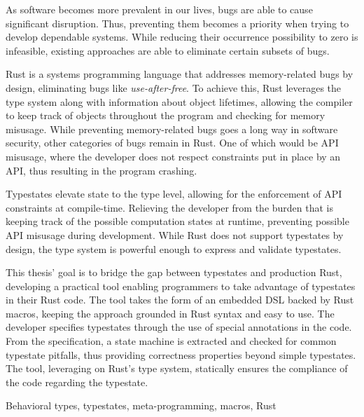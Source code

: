 

As software becomes more prevalent in our lives, bugs are able to cause significant disruption.
Thus, preventing them becomes a priority when trying to develop dependable systems.
While reducing their occurrence possibility to zero is infeasible,
existing approaches are able to eliminate certain subsets of bugs.

Rust is a systems programming language that addresses memory-related bugs by design,
eliminating bugs like \emph{use-after-free}.
To achieve this, Rust leverages the type system along with information about object lifetimes,
allowing the compiler to keep track of objects throughout the program and checking for memory misusage.
While preventing memory-related bugs goes a long way in software security, other categories of bugs remain in Rust.
One of which would be \gls{API} misusage, where the developer does not respect constraints put in place by an \gls{API},
thus resulting in the program crashing.

Typestates elevate state to the type level, allowing for the enforcement of \gls{API} constraints at compile-time.
Relieving the developer from the burden that is keeping track of the possible computation states at runtime,
preventing possible \gls{API} misusage during development.
While Rust does not support typestates by design,
the type system is powerful enough to express and validate typestates.

This thesis' goal is to bridge the gap between typestates and production Rust,
developing a practical tool enabling programmers to take advantage of typestates in their Rust code.
The tool takes the form of an embedded DSL backed by Rust macros,
keeping the approach grounded in Rust syntax and easy to use.
The developer specifies typestates through the use of special annotations in the code.
From the specification, a state machine is extracted and checked for common typestate pitfalls,
thus providing correctness properties beyond simple typestates.
The tool, leveraging on Rust's type system, statically ensures the compliance of the code regarding the typestate.

\begin{keywords}
Behavioral types, typestates, meta-programming, macros, Rust
\end{keywords}
